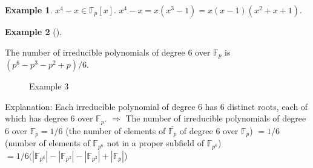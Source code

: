 \documentclass{article}
\theoremstyle{definition}
\newtheorem{ex}{Example}
\newenvironment{exs}[1][]{%
  \begin{ex}[#1]$ $\par\nobreak\ignorespaces
}{%
  \end{ex}
}
\newcommand{\FF}{\mathbb F}
\newcommand{\Ra}{\Rightarrow}
\begin{document}
\begin{ex}
	$x^4 - x \in \FF_p[x]$.
	$x^4 - x = x(x^3 - 1) = x(x - 1)(x^2 + x + 1)$.
\end{ex}

\begin{exs}
	The number of irreducible polynomials of degree 6 over $\FF_p$ is $(p^6 - p^3 - p^2 + p)/6$.

				\begin{figure}[H]
					\centering
					\caption{Example 3}
				\end{figure}
	
	\par Explanation: Each irreducible polynomial of degree 6 has 6 distinct roots, each of which has degree 6 over $\FF_p$.
	$\Ra$ The number of irreducible polynomials of degree 6 over $\FF_p = 1/6$ (the number of elements of $\overline{\FF_p}$ of degree 6 over $\FF_p$)
	$=1/6$ (number of elements of $\FF_{p^6}$ not in a proper subfield of $\FF_{p^6}$) $=1/6 (|\FF_{p^6}| - |\FF_{p^3}| - |\FF_{p^2}| +  |\FF_p|$)
\end{exs}
\end{document}
